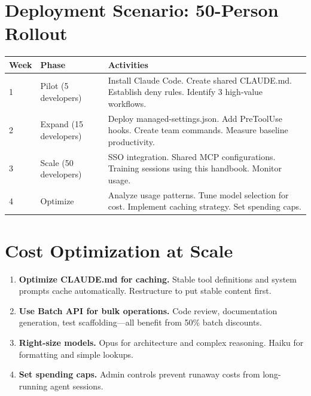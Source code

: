 \section{Deployment Scenario: 50-Person Rollout}
\label{sec:deployment-scenario}


\begin{fullwidth}
\begin{tabular}{@{}llp{8cm}@{}}
\toprule
\textbf{Week} & \textbf{Phase} & \textbf{Activities} \\
\midrule
1 & Pilot (5 developers) & Install Claude Code. Create shared CLAUDE.md.
  Establish deny rules. Identify 3 high-value workflows. \\
2 & Expand (15 developers) & Deploy managed-settings.json. Add PreToolUse hooks.
  Create team commands. Measure baseline productivity. \\
3 & Scale (50 developers) & SSO integration. Shared MCP configurations.
  Training sessions using this handbook. Monitor usage. \\
4 & Optimize & Analyze usage patterns. Tune model selection for cost.
  Implement caching strategy. Set spending caps. \\
\bottomrule
\end{tabular}
\end{fullwidth}

\section{Cost Optimization at Scale}
\label{sec:cost-scale}


\begin{enumerate}
  \item \textbf{Optimize CLAUDE.md for caching.}
    Stable tool definitions and system prompts cache automatically.
    Restructure to put stable content first.
  \item \textbf{Use Batch API for bulk operations.}
    Code review, documentation generation, test scaffolding---all benefit
    from 50\% batch discounts.
  \item \textbf{Right-size models.}
    Opus for architecture and complex reasoning.
    Haiku for formatting and simple lookups.
  \item \textbf{Set spending caps.}
    Admin controls prevent runaway costs from long-running agent sessions.
\end{enumerate}

